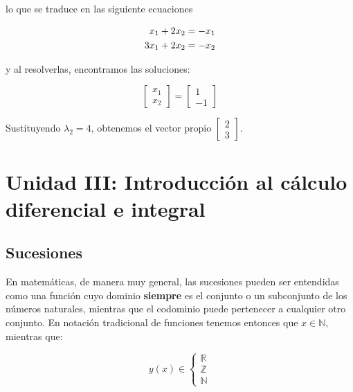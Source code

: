 \documentclass[
]{book}
\begin{document}
lo que se traduce en las siguiente ecuaciones

\begin{align}
x_1 + 2x_2 &= -x_1 \\ \notag
3x_1 + 2x_2 &= -x_2 \notag
\end{align}

y al resolverlas, encontramos las soluciones:

\begin{equation}
\left[ 
\begin{array}{c}
x_1 \\ x_2
\end{array}
\right] =
\left[ 
\begin{array}{c}
1 \\ -1
\end{array}
\right] 
\end{equation}

Sustituyendo \(\lambda_2 = 4\), obtenemos el vector propio \(\left[ \begin{array}{c} 2 \\ 3 \end{array} \right]\).

\hypertarget{unidad-iii-introducciuxf3n-al-cuxe1lculo-diferencial-e-integral}{%
\chapter{Unidad III: Introducción al cálculo diferencial e integral}\label{unidad-iii-introducciuxf3n-al-cuxe1lculo-diferencial-e-integral}}

\hypertarget{sucesiones}{%
\section{Sucesiones}\label{sucesiones}}

En matemáticas, de manera muy general, las sucesiones pueden ser entendidas como una función cuyo dominio \textbf{siempre} es el conjunto o un subconjunto de los números naturales, mientras que el codominio puede pertenecer a cualquier otro conjunto. En notación tradicional de funciones tenemos entonces que \(x \in \mathbb{N}\), mientras que:

\begin{equation}
y(x) \in \begin{cases}\mathbb{R}\\ \mathbb{Z}\\ \mathbb{N} \end{cases}
\end{equation}
\end{document}
